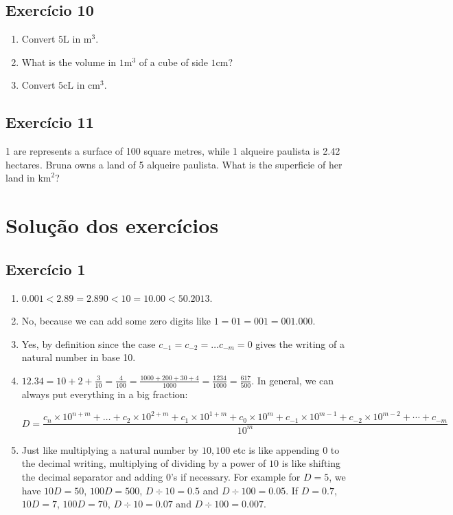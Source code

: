 \subsection*{Exercício 10}

\begin{enumerate}
\item Convert $5 \text{L}$ in $\text{m}^3$.
\item What is the volume in $1\text{m}^3$ of a cube of side $1\text{cm}$?
\item Convert $5 \text{cL}$ in $\text{cm}^3$.
\end{enumerate}

\subsection*{Exercício 11}

1 are represents a surface of 100 square metres, while 1 alqueire paulista is
2.42 hectares. Bruna owns a land of 5 alqueire paulista. What is the superficie
of her land in $\text{km}^2$?

\section{Solução dos exercícios}

\subsection*{Exercício 1}

\begin{enumerate}
\item $0.001 < 2.89 = 2.890 < 10 = 10.00 < 50.2013$.
\item No, because we can add some zero digits like $1=01=001=001.000$.
\item Yes, by definition since the case $c_{-1}=c_{-2}=\dots c_{-m} = 0$
  gives the writing of a natural number in base 10.
\item
  $12.34 = 10 + 2 + \frac{3}{10} = \frac{4}{100} =
  \frac{1000+200+30+4}{1000} = \frac{1234}{1000} =
  \frac{617}{500}$. In general, we can always put everything in a big fraction:

$$D=
\frac{{c_n \times 10^{n+m}} + \dots + {c_2 \times 10^{2+m}} + {c_1 \times 10^{1+m}} + {c_0 \times 10^m} +
{c_{-1} \times 10^{m-1}} +
{c_{-2} \times 10^{m-2}} + \cdots +
{c_{-m}}}{10^{m}}
$$

\item Just like multiplying a natural number by $10,100$ etc is like
  appending $0$ to the decimal writing,
  multiplying of dividing by a power of $10$ is like shifting the decimal
  separator and adding $0$'s if necessary.
  For example for $D=5$, we have
  $10D=50$, $100D=500$, $D \div 10 = 0.5$ and $D \div 100 = 0.05$.
  If $D=0.7$,
  $10D=7$, $100D=70$, $D \div 10 = 0.07$ and $D \div 100 = 0.007$.

\end{enumerate}

